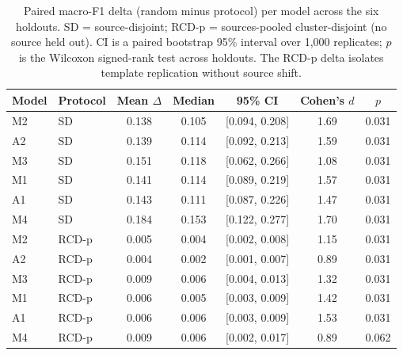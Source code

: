
\begin{table}[!htbp]
\centering
\caption{Paired macro-F1 delta (random minus protocol) per model across the six holdouts. SD = source-disjoint; RCD-p = sources-pooled cluster-disjoint (no source held out). CI is a paired bootstrap 95\% interval over 1{,}000 replicates; $p$ is the Wilcoxon signed-rank test across holdouts. The RCD-p delta isolates template replication without source shift.}
\label{tab:paired_delta}
\begin{tabular}{llccccc}
\hline\hline
Model & Protocol & Mean $\Delta$ & Median & 95\% CI & Cohen's $d$ & $p$ \\
\hline
M2 & SD       & 0.138 & 0.105 & [0.094, 0.208] & 1.69 & 0.031 \\
A2 & SD       & 0.139 & 0.114 & [0.092, 0.213] & 1.59 & 0.031 \\
M3 & SD       & 0.151 & 0.118 & [0.062, 0.266] & 1.08 & 0.031 \\
M1 & SD       & 0.141 & 0.114 & [0.089, 0.219] & 1.57 & 0.031 \\
A1 & SD       & 0.143 & 0.111 & [0.087, 0.226] & 1.47 & 0.031 \\
M4 & SD       & 0.184 & 0.153 & [0.122, 0.277] & 1.70 & 0.031 \\
M2 & RCD-p     & 0.005 & 0.004 & [0.002, 0.008] & 1.15 & 0.031 \\
A2 & RCD-p     & 0.004 & 0.002 & [0.001, 0.007] & 0.89 & 0.031 \\
M3 & RCD-p     & 0.009 & 0.006 & [0.004, 0.013] & 1.32 & 0.031 \\
M1 & RCD-p     & 0.006 & 0.005 & [0.003, 0.009] & 1.42 & 0.031 \\
A1 & RCD-p     & 0.006 & 0.006 & [0.003, 0.009] & 1.53 & 0.031 \\
M4 & RCD-p     & 0.009 & 0.006 & [0.002, 0.017] & 0.89 & 0.062 \\
\hline\hline
\end{tabular}
\end{table}